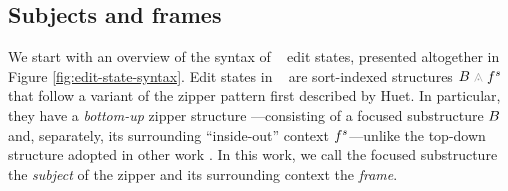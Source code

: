 \subsection{Subjects and frames} \label{sec:subjects-and-frames}



We start with an overview of the syntax of \ty~ edit states,
presented altogether in Figure \ref{fig:edit-state-syntax}.
Edit states in \ty~ are sort-indexed structures
$\zipper{\subject}{\tfrelem^s}$ that follow a variant
of the zipper pattern first described by Huet.
In particular, they have a \emph{bottom-up}
zipper structure ---consisting of a focused substructure
$B$ and, separately,
its surrounding ``inside-out'' context $f^s$---unlike
the top-down structure adopted in other work .
In this work, we call the focused substructure the \emph{subject} of
the zipper and its surrounding context the \emph{frame}.






